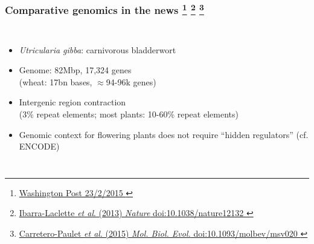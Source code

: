 
%
\begin{frame}
  \frametitle{Comparative genomics in the news
                   \footnote{\tiny{\href{http://www.washingtonpost.com/news/speaking-of-science/wp/2015/02/23/the-mysterious-genes-of-carnivorous-bladderwort-reveal-themselves/
}{Washington Post 23/2/2015
}}}
                   \footnote{\tiny{\href{http://dx.doi.org/10.1038/nature12132
}{Ibarra-Laclette \textit{et al}. (2013) \textit{Nature} doi:10.1038/nature12132
}}}
                   \footnote{\tiny{\href{http://dx.doi.org/10.1093/molbev/msv020
}{Carretero-Paulet \textit{et al}. (2015) \textit{Mol. Biol. Evol.} doi:10.1093/molbev/msv020
}}}
}
    \begin{columns}[c] 
        \begin{itemize}
          \item \textcolor{RawSienna}{\textit{Utricularia gibba}: carnivorous bladderwort}
          \item \textcolor{hutton_blue}{Genome: 82Mbp, 17,324 genes \\
          (wheat: 17bn bases, $\approx$94-96k genes)}
          \item Intergenic region contraction \\
          (3\% repeat elements; most plants: 10-60\% repeat elements)
          \item \textcolor{hutton_green}{Genomic context for flowering plants does not require ``hidden regulators'' (cf. ENCODE)}
        \end{itemize}

\end{columns}
\end{frame}
